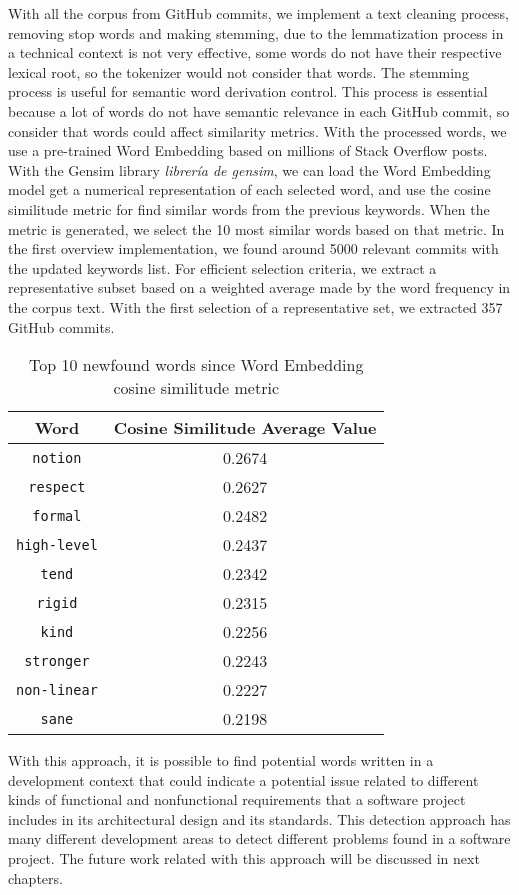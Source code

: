 With all the corpus from GitHub commits, we implement a text cleaning process, removing stop words and making stemming, due to the lemmatization process in a technical context is not very effective, some words do not have their respective lexical root, so the tokenizer would not consider that words. The stemming process is useful for semantic word derivation control. This process is essential because a lot of words do not have semantic relevance in each GitHub commit, so consider that words could affect similarity metrics. With the processed words, we use a pre-trained Word Embedding based on millions of Stack Overflow posts. With the Gensim library \emph{librería de gensim}, we can load the Word Embedding model get a numerical representation of each selected word, and use the cosine similitude metric for find similar words from the previous keywords. When the metric is generated, we select the 10 most similar words based on that metric.
In the first overview implementation, we found around 5000 relevant commits with the updated keywords list. For efficient selection criteria, we extract a representative subset based on a weighted average made by the word frequency in the corpus text. With the first selection of a representative set, we extracted 357 GitHub commits. 


\begin{table}[H]
    \centering
    \begin{tabular}{|c|c|}
    \hline
       Word  & Cosine Similitude Average Value \\
       \hline
        \texttt{notion} & 0.2674 \\
        \hline
        \texttt{respect} & 0.2627 \\
        \hline
        \texttt{formal} & 0.2482 \\
        \hline
        \texttt{high-level} & 0.2437 \\
        \hline
        \texttt{tend} & 0.2342 \\
        \hline
        \texttt{rigid} & 0.2315 \\
        \hline
        \texttt{kind} & 0.2256 \\
        \hline
        \texttt{stronger} & 0.2243 \\
        \hline
        \texttt{non-linear} & 0.2227 \\
        \hline
        \texttt{sane} & 0.2198 \\
        \hline
    \end{tabular}
    \caption{Top 10 newfound words since Word Embedding cosine similitude metric}
    \label{tab:my_label}
\end{table}

With this approach, it is possible to find potential words written in a development context that could indicate a potential issue related to different kinds of functional and nonfunctional requirements that a software project includes in its architectural design and its standards. This detection approach has many different development areas to detect different problems found in a software project. The future work related with this approach will be discussed in next chapters.
\endinput